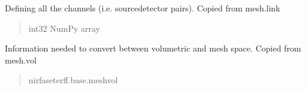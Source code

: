 \documentclass[letterpaper,10pt,english]{sphinxmanual}
\begin{document}
\begin{fulllineitems}
\begin{fulllineitems}
\begin{quote}
\begin{description}
\end{description}\end{quote}

\end{fulllineitems}


\begin{fulllineitems}
\label{\detokenize{_autosummary/nirfasterff.base.data.TRMomentsdata:nirfasterff.base.data.TRMomentsdata.link}}
\pysigstartsignatures
\pysigline
{}
\pysigstopsignatures
\sphinxAtStartPar
Defining all the channels (i.e. source\sphinxhyphen{}detector pairs). Copied from mesh.link
\begin{quote}\begin{description}
\sphinxAtStartPar
int32 NumPy array

\end{description}\end{quote}

\end{fulllineitems}


\begin{fulllineitems}
\label{\detokenize{_autosummary/nirfasterff.base.data.TRMomentsdata:nirfasterff.base.data.TRMomentsdata.vol}}
\pysigstartsignatures
\pysigline
{}
\pysigstopsignatures
\sphinxAtStartPar
Information needed to convert between volumetric and mesh space. Copied from mesh.vol
\begin{quote}\begin{description}
\sphinxAtStartPar
nirfaseterff.base.meshvol

\end{description}\end{quote}

\end{fulllineitems}


\begin{fulllineitems}
\label{\detokenize{_autosummary/nirfasterff.base.data.TRMomentsdata:nirfasterff.base.data.TRMomentsdata.__init__}}
\pysigstartsignatures
\pysiglinewithargsret
{}
{}
{}
\pysigstopsignatures
\end{fulllineitems}


\end{fulllineitems}
\end{document}
